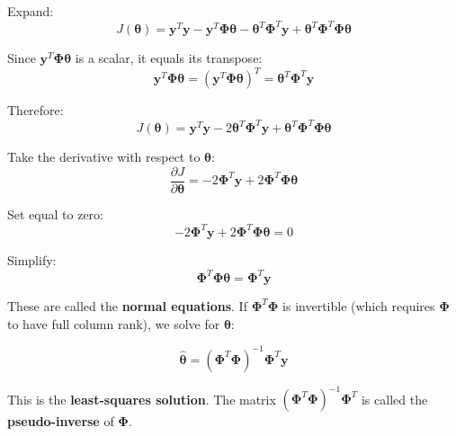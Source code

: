 Expand:
\begin{equation}
J(\boldsymbol{\theta}) = \mathbf{y}^T\mathbf{y} - \mathbf{y}^T\mathbf{\Phi}\boldsymbol{\theta} - \boldsymbol{\theta}^T\mathbf{\Phi}^T\mathbf{y} + \boldsymbol{\theta}^T\mathbf{\Phi}^T\mathbf{\Phi}\boldsymbol{\theta}
\end{equation}

Since $\mathbf{y}^T\mathbf{\Phi}\boldsymbol{\theta}$ is a scalar, it equals its transpose:
\begin{equation}
\mathbf{y}^T\mathbf{\Phi}\boldsymbol{\theta} = (\mathbf{y}^T\mathbf{\Phi}\boldsymbol{\theta})^T = \boldsymbol{\theta}^T\mathbf{\Phi}^T\mathbf{y}
\end{equation}

Therefore:
\begin{equation}
J(\boldsymbol{\theta}) = \mathbf{y}^T\mathbf{y} - 2\boldsymbol{\theta}^T\mathbf{\Phi}^T\mathbf{y} + \boldsymbol{\theta}^T\mathbf{\Phi}^T\mathbf{\Phi}\boldsymbol{\theta}
\end{equation}

Take the derivative with respect to $\boldsymbol{\theta}$:
\begin{equation}
\frac{\partial J}{\partial \boldsymbol{\theta}} = -2\mathbf{\Phi}^T\mathbf{y} + 2\mathbf{\Phi}^T\mathbf{\Phi}\boldsymbol{\theta}
\end{equation}

Set equal to zero:
\begin{equation}
-2\mathbf{\Phi}^T\mathbf{y} + 2\mathbf{\Phi}^T\mathbf{\Phi}\boldsymbol{\theta} = 0
\end{equation}

Simplify:
\begin{equation}
\mathbf{\Phi}^T\mathbf{\Phi}\boldsymbol{\theta} = \mathbf{\Phi}^T\mathbf{y}
\end{equation}

These are called the \textbf{normal equations}. If $\mathbf{\Phi}^T\mathbf{\Phi}$ is invertible (which requires $\mathbf{\Phi}$ to have full column rank), we solve for $\boldsymbol{\theta}$:

\begin{equation}
\boxed{\hat{\boldsymbol{\theta}} = (\mathbf{\Phi}^T\mathbf{\Phi})^{-1}\mathbf{\Phi}^T\mathbf{y}}
\end{equation}

This is the \textbf{least-squares solution}. The matrix $(\mathbf{\Phi}^T\mathbf{\Phi})^{-1}\mathbf{\Phi}^T$ is called the \textbf{pseudo-inverse} of $\mathbf{\Phi}$.

